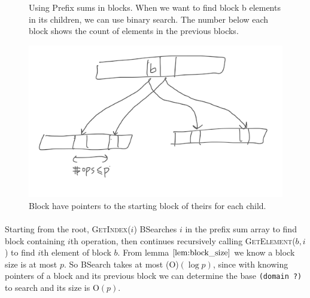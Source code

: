\documentclass[10pt]{article}
\theoremstyle{definition}
\begin{document}
\begin{figure}
\begin{center}
\end{center}
\caption{\label{fig:prefix} Using Prefix sums in blocks. When we want to find block b elements in its children, we can use binary search. The number below each block shows the count of elements in the previous blocks.}
\end{figure}

\begin{figure}[hbt]
\centering
  \includegraphics[width=5in]{pics/pointers}
  \caption{Block have pointers to the starting block of theirs for each child. \label{fig::pointer}}
\end{figure}

\paragraph{}
Starting from the root, \textsc{GetIndex}($i$) BSearches $i$ in the prefix sum array to find block containing $i$th operation, then continues recursively calling \textsc{GetElement}($b,i$) to find $i$th element of block $b$. From lemma $\ref{lem:block_size}$ we know a block size is at most $p$. So BSearch takes at most \textsc(O)$(\log p)$, since  with knowing pointers of a block and its previous block we can determine the base \texttt{(domain ?)} to search and its size is \textsc{O}$(p)$.
\end{document}
